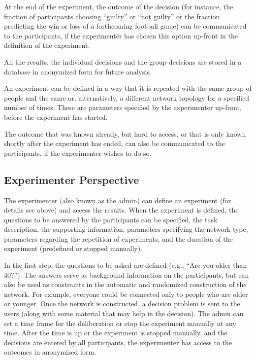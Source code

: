 \documentclass[a4paper, 10pt]{scrreprt}
\begin{document}
At the end of the experiment, the outcome of the decision (for instance, the fraction of participants choosing ``guilty'' or ``not guilty'' or the fraction predicting the win or loss of a forthcoming football game) can be communicated to the participants, if the experimenter has chosen this option up-front in the definition of the experiment.

All the results, the individual decisions and the group decisions are stored in a database in anonymized form for future analysis.

An experiment can be defined in a way that it is repeated with the same group of people and the same or, alternatively, a different network topology for a specified number of times. These are parameters specified by the experimenter up-front, before the experiment has started.

The outcome that was known already, but hard to access, or that is only known shortly after the experiment has ended, can also be communicated to the participants, if the experimenter wishes to do so.

\subsection{Experimenter Perspective}
The experimenter (also known as the admin) can define an experiment (for details see above) and access the results. When the experiment is defined, the questions to be answered by the participants can be specified, the task description, the supporting information, parameters specifying the network type, parameters regarding the repetition of experiments, and the duration of the experiment (predefined or stopped manually). 

In the first step, the questions to be asked are defined (e.g., ``Are you older than 40?''). The answers serve as background information on the participants, but can also be used as constraints in the automatic and randomized construction of the network. For example, everyone could be connected only to people who are older or younger. Once the network is constructed, a decision problem is sent to the users (along with some material that may help in the decision). The admin can set a time frame for the deliberation or stop the experiment manually at any time. After the time is up or the experiment is stopped manually, and the decisions are entered by all participants, the experimenter has access to the outcomes in anonymized form.
\end{document}
